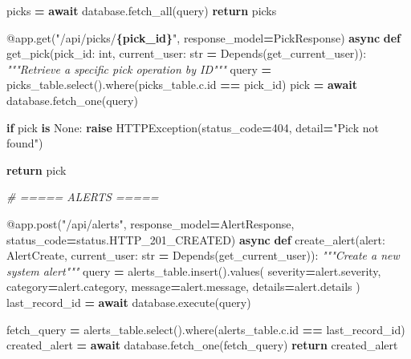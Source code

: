 \documentclass[
]{article}
\newenvironment{Shaded}{\begin{snugshade}}{\end{snugshade}}
\newcommand{\AttributeTok}[1]{\textcolor[rgb]{0.13,0.29,0.53}{#1}}
\newcommand{\BuiltInTok}[1]{#1}
\newcommand{\CommentTok}[1]{\textcolor[rgb]{0.56,0.35,0.01}{\textit{#1}}}
\newcommand{\ControlFlowTok}[1]{\textcolor[rgb]{0.13,0.29,0.53}{\textbf{#1}}}
\newcommand{\DecValTok}[1]{\textcolor[rgb]{0.00,0.00,0.81}{#1}}
\newcommand{\KeywordTok}[1]{\textcolor[rgb]{0.13,0.29,0.53}{\textbf{#1}}}
\newcommand{\NormalTok}[1]{#1}
\newcommand{\OperatorTok}[1]{\textcolor[rgb]{0.81,0.36,0.00}{\textbf{#1}}}
\newcommand{\SpecialCharTok}[1]{\textcolor[rgb]{0.81,0.36,0.00}{\textbf{#1}}}
\newcommand{\StringTok}[1]{\textcolor[rgb]{0.31,0.60,0.02}{#1}}
\newcommand{\VariableTok}[1]{\textcolor[rgb]{0.00,0.00,0.00}{#1}}
\begin{document}
\begin{Shaded}
\begin{Highlighting}[]
\NormalTok{    picks }\OperatorTok{=} \ControlFlowTok{await}\NormalTok{ database.fetch\_all(query)}
    \ControlFlowTok{return}\NormalTok{ picks}

\AttributeTok{@app.get}\NormalTok{(}\StringTok{"/api/picks/}\SpecialCharTok{\{pick\_id\}}\StringTok{"}\NormalTok{, response\_model}\OperatorTok{=}\NormalTok{PickResponse)}
\ControlFlowTok{async} \KeywordTok{def}\NormalTok{ get\_pick(pick\_id: }\BuiltInTok{int}\NormalTok{, current\_user: }\BuiltInTok{str} \OperatorTok{=}\NormalTok{ Depends(get\_current\_user)):}
    \CommentTok{"""Retrieve a specific pick operation by ID"""}
\NormalTok{    query }\OperatorTok{=}\NormalTok{ picks\_table.select().where(picks\_table.c.}\BuiltInTok{id} \OperatorTok{==}\NormalTok{ pick\_id)}
\NormalTok{    pick }\OperatorTok{=} \ControlFlowTok{await}\NormalTok{ database.fetch\_one(query)}

    \ControlFlowTok{if}\NormalTok{ pick }\KeywordTok{is} \VariableTok{None}\NormalTok{:}
        \ControlFlowTok{raise}\NormalTok{ HTTPException(status\_code}\OperatorTok{=}\DecValTok{404}\NormalTok{, detail}\OperatorTok{=}\StringTok{"Pick not found"}\NormalTok{)}

    \ControlFlowTok{return}\NormalTok{ pick}

\CommentTok{\# ===== ALERTS =====}

\AttributeTok{@app.post}\NormalTok{(}\StringTok{"/api/alerts"}\NormalTok{, response\_model}\OperatorTok{=}\NormalTok{AlertResponse, status\_code}\OperatorTok{=}\NormalTok{status.HTTP\_201\_CREATED)}
\ControlFlowTok{async} \KeywordTok{def}\NormalTok{ create\_alert(alert: AlertCreate, current\_user: }\BuiltInTok{str} \OperatorTok{=}\NormalTok{ Depends(get\_current\_user)):}
    \CommentTok{"""Create a new system alert"""}
\NormalTok{    query }\OperatorTok{=}\NormalTok{ alerts\_table.insert().values(}
\NormalTok{        severity}\OperatorTok{=}\NormalTok{alert.severity,}
\NormalTok{        category}\OperatorTok{=}\NormalTok{alert.category,}
\NormalTok{        message}\OperatorTok{=}\NormalTok{alert.message,}
\NormalTok{        details}\OperatorTok{=}\NormalTok{alert.details}
\NormalTok{    )}
\NormalTok{    last\_record\_id }\OperatorTok{=} \ControlFlowTok{await}\NormalTok{ database.execute(query)}

\NormalTok{    fetch\_query }\OperatorTok{=}\NormalTok{ alerts\_table.select().where(alerts\_table.c.}\BuiltInTok{id} \OperatorTok{==}\NormalTok{ last\_record\_id)}
\NormalTok{    created\_alert }\OperatorTok{=} \ControlFlowTok{await}\NormalTok{ database.fetch\_one(fetch\_query)}
    \ControlFlowTok{return}\NormalTok{ created\_alert}


\end{Highlighting}
\end{Shaded}
\end{document}
